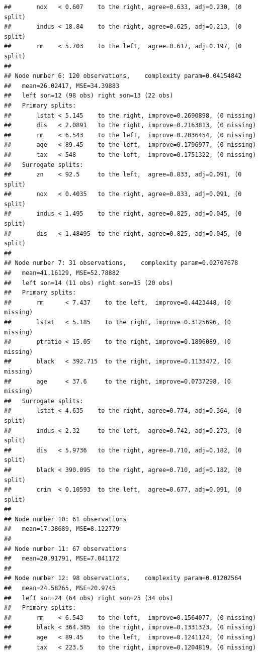 \documentclass[]{book}
\theoremstyle{plain}
\theoremstyle{definition}
\begin{document}
\begin{verbatim}
##       nox   < 0.607    to the right, agree=0.633, adj=0.230, (0 split)
##       indus < 18.84    to the right, agree=0.625, adj=0.213, (0 split)
##       rm    < 5.703    to the left,  agree=0.617, adj=0.197, (0 split)
## 
## Node number 6: 120 observations,    complexity param=0.04154842
##   mean=26.02417, MSE=34.39883 
##   left son=12 (98 obs) right son=13 (22 obs)
##   Primary splits:
##       lstat < 5.145    to the right, improve=0.2690898, (0 missing)
##       dis   < 2.0891   to the right, improve=0.2163813, (0 missing)
##       rm    < 6.543    to the left,  improve=0.2036454, (0 missing)
##       age   < 89.45    to the left,  improve=0.1796977, (0 missing)
##       tax   < 548      to the left,  improve=0.1751322, (0 missing)
##   Surrogate splits:
##       zn    < 92.5     to the left,  agree=0.833, adj=0.091, (0 split)
##       nox   < 0.4035   to the right, agree=0.833, adj=0.091, (0 split)
##       indus < 1.495    to the right, agree=0.825, adj=0.045, (0 split)
##       dis   < 1.48495  to the right, agree=0.825, adj=0.045, (0 split)
## 
## Node number 7: 31 observations,    complexity param=0.02707678
##   mean=41.16129, MSE=52.78882 
##   left son=14 (11 obs) right son=15 (20 obs)
##   Primary splits:
##       rm      < 7.437    to the left,  improve=0.4423448, (0 missing)
##       lstat   < 5.185    to the right, improve=0.3125696, (0 missing)
##       ptratio < 15.05    to the right, improve=0.1896089, (0 missing)
##       black   < 392.715  to the right, improve=0.1133472, (0 missing)
##       age     < 37.6     to the right, improve=0.0737298, (0 missing)
##   Surrogate splits:
##       lstat < 4.635    to the right, agree=0.774, adj=0.364, (0 split)
##       indus < 2.32     to the left,  agree=0.742, adj=0.273, (0 split)
##       dis   < 5.9736   to the right, agree=0.710, adj=0.182, (0 split)
##       black < 390.095  to the right, agree=0.710, adj=0.182, (0 split)
##       crim  < 0.10593  to the left,  agree=0.677, adj=0.091, (0 split)
## 
## Node number 10: 61 observations
##   mean=17.38689, MSE=8.122779 
## 
## Node number 11: 67 observations
##   mean=20.91791, MSE=7.041172 
## 
## Node number 12: 98 observations,    complexity param=0.01202564
##   mean=24.58265, MSE=20.9745 
##   left son=24 (64 obs) right son=25 (34 obs)
##   Primary splits:
##       rm    < 6.543    to the left,  improve=0.1564077, (0 missing)
##       black < 364.385  to the right, improve=0.1331323, (0 missing)
##       age   < 89.45    to the left,  improve=0.1241124, (0 missing)
##       tax   < 223.5    to the right, improve=0.1204819, (0 missing)

\end{verbatim}
\end{document}
